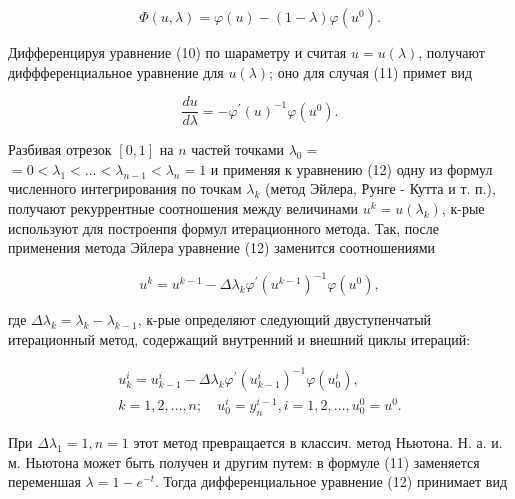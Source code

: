 \documentclass[10pt]{article}
\begin{document}
\[

\Phi(u, \lambda)=\varphi(u)-(1-\lambda) \varphi\left(u^{0}\right) .

\]



Дифференцируя уравнение (10) по шараметру и считая $u=u(\lambda)$, получают диффференциальное уравнение для $u(\lambda)$; оно для случая (11) примет вид



\[

\frac{d u}{d \lambda}=-\varphi^{\prime}(u)^{-1} \varphi\left(u^{0}\right) .

\]



Разбивая отрезок $[0,1]$ на $n$ частей точками $\lambda_{0}=$ $=0<\lambda_{1}<\ldots<\lambda_{n-1}<\lambda_{n}=1$ и применяя к уравнению (12) одну из формул численного интегрирования по точкам $\lambda_{k}$ (метод Эйлера, Рунге - Кутта и т. п.), получают рекуррентные соотношения между величинами $u^{k}=u\left(\lambda_{k}\right)$, к-рые используют для построенпя формул итерационного метода. Так, после применения метода Эйлера уравнение (12) заменится соотношениями



\[

u^{k}=u^{k-1}-\Delta \lambda_{k} \varphi^{\prime}\left(u^{k-1}\right)^{-1} \varphi\left(u^{0}\right),

\]



где $\Delta \lambda_{k}=\lambda_{k}-\lambda_{k-1}$, к-рые определяют следующий двуступенчатый итерационный метод, содержащий внутренний и внешний циклы итераций:



\[

\begin{gathered}

u_{k}^{i}=u_{k-1}^{i}-\Delta \lambda_{k} \varphi^{\prime}\left(u_{k-1}^{i}\right)^{-1} \varphi\left(u_{0}^{i}\right), \\

k=1,2, \ldots, n ; \quad u_{0}^{i}=y_{n}^{i-1}, i=1,2, \ldots, u_{0}^{0}=u^{0} .

\end{gathered}

\]



При $\Delta \lambda_{1}=1, n=1$ этот метод превращается в классич. метод Ньютона. Н. а. и. м. Ньютона может быть получен и другим путем: в формуле (11) заменяется переменшая $\lambda=1-e^{-t}$. Тогда дифференциальное уравнение (12) принимает вид
\end{document}
